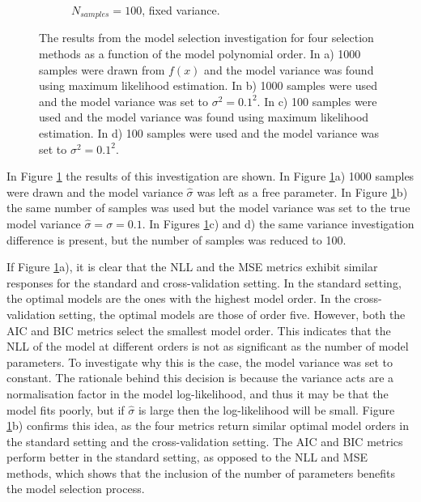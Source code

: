\documentclass{article}
\begin{document}
\begin{figure}[!htb]
\begin{subfigure}[b]{0.45\textwidth}
         \caption{$N_{samples} = 100$, fixed variance.}
     \end{subfigure}
        \caption{The results from the model selection investigation for four selection methods as a function of the model polynomial order. In a) 1000 samples were drawn from $f(x)$ and the model variance was found using maximum likelihood estimation. In b) 1000 samples were used and the model variance was set to $\sigma^2=0.1^2$. In c) 100 samples were used and the model variance was found using maximum likelihood estimation. In d) 100 samples were used and the model variance was set to $\sigma^2=0.1^2$.}
        \label{fig:Q2b_2}
\end{figure}

In Figure \ref{fig:Q2b_2} the results of this investigation are shown. In Figure \ref{fig:Q2b_2}a) 1000 samples were drawn and the model variance $\hat{\sigma}$ was left as a free parameter. In Figure \ref{fig:Q2b_2}b) the same number of samples was used but the model variance was set to the true model variance $\hat{\sigma}=\sigma=0.1$. In Figures \ref{fig:Q2b_2}c) and d) the same variance investigation difference is present, but the number of samples was reduced to 100.

If Figure \ref{fig:Q2b_2}a), it is clear that the NLL and the MSE metrics exhibit similar responses for the standard and cross-validation setting. In the standard setting, the optimal models are the ones with the highest model order. In the cross-validation setting, the optimal models are those of order five. However, both the AIC and BIC metrics select the smallest model order. This indicates that the NLL of the model at different orders is not as significant as the number of model parameters. To investigate why this is the case, the model variance was set to constant. The rationale behind this decision is because the variance acts are a normalisation factor in the model log-likelihood, and thus it may be that the model fits poorly, but if $\hat{\sigma}$ is large then the log-likelihood will be small. Figure \ref{fig:Q2b_2}b) confirms this idea, as the four metrics return similar optimal model orders in the standard setting and the cross-validation setting. The AIC and BIC metrics perform better in the standard setting, as opposed to the NLL and MSE methods, which shows that the inclusion of the number of parameters benefits the model selection process. 
\end{document}
